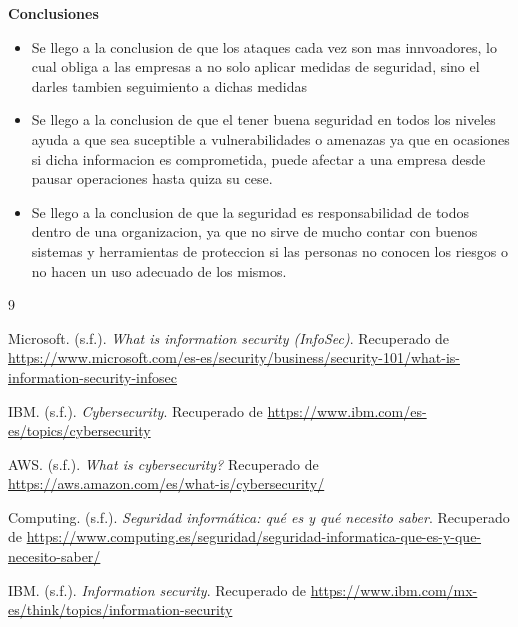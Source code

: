 \documentclass[12pt]{article}
\begin{document}
\noindent\textbf{Conclusiones} 
\begin{itemize}
    \item{Se llego a la conclusion de que los ataques cada vez son mas innvoadores, lo cual obliga a las empresas a no solo aplicar medidas de seguridad, sino el darles tambien seguimiento a dichas medidas}
    \item {Se llego a la conclusion de que el tener buena seguridad en todos los niveles ayuda a que sea suceptible a vulnerabilidades o amenazas ya que en ocasiones si dicha informacion es comprometida, puede afectar a una empresa desde pausar operaciones hasta  quiza su cese.}
    \item{Se llego a la conclusion de que la seguridad es responsabilidad de todos dentro de una organizacion, ya que no sirve de mucho contar con buenos sistemas y herramientas de proteccion si las personas no conocen los riesgos o no hacen un uso adecuado de los mismos.}

\end{itemize}


\begin{thebibliography}{9}

Microsoft. (s.f.). \textit{What is information security (InfoSec)}. Recuperado de \url{https://www.microsoft.com/es-es/security/business/security-101/what-is-information-security-infosec}

IBM. (s.f.). \textit{Cybersecurity}. Recuperado de \url{https://www.ibm.com/es-es/topics/cybersecurity}

AWS. (s.f.). \textit{What is cybersecurity?} Recuperado de \url{https://aws.amazon.com/es/what-is/cybersecurity/}

Computing. (s.f.). \textit{Seguridad informática: qué es y qué necesito saber}. Recuperado de \url{https://www.computing.es/seguridad/seguridad-informatica-que-es-y-que-necesito-saber/}

IBM. (s.f.). \textit{Information security}. Recuperado de \url{https://www.ibm.com/mx-es/think/topics/information-security}

\end{thebibliography}
\end{document}
